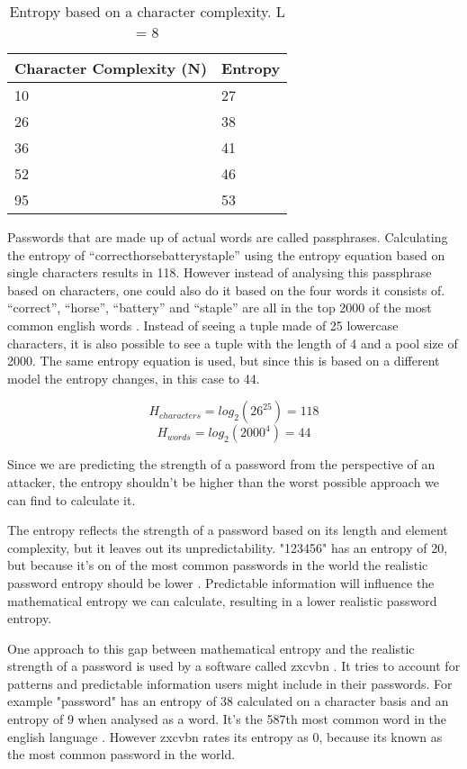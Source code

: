 \begin{table}[h!]
\centering
\begin{tabular}{l l}
    Character Complexity (N) & Entropy \\
    \hline
    10                       & 27 \\
    26                       & 38 \\
    36                       & 41 \\
    52                       & 46 \\
    95                       & 53
\end{tabular}
\caption{Entropy based on a character complexity. L = 8}
\end{table}

Passwords that are made up of actual words are called passphrases. Calculating the entropy of ``correcthorsebatterystaple'' using the entropy equation based on single characters results in 118. However instead of analysing this passphrase based on characters, one could also do it based on the four words it consists of. ``correct'', ``horse'', ``battery'' and ``staple'' are all in the top 2000 of the most common english words \cite{commonwords}. Instead of seeing a tuple made of 25 lowercase characters, it is also possible to see a tuple with the length of 4 and a pool size of 2000. The same entropy equation is used, but since this is based on a different model the entropy changes, in this case to 44.

\begin{equation}
H_{characters} = log_2(26^25) = 118
\end{equation}
\begin{equation}
H_{words} = log_2(2000^4) = 44
\end{equation}

Since we are predicting the strength of a password from the perspective of an attacker, the entropy shouldn't be higher than the worst possible approach we can find to calculate it.

The entropy reflects the strength of a password based on its length and element complexity, but it leaves out its unpredictability. "123456" has an entropy of 20, but because it's on of the most common passwords in the world the realistic password entropy should be lower \cite{passwordquality}. Predictable information will influence the mathematical entropy we can calculate, resulting in a lower realistic password entropy.

One approach to this gap between mathematical entropy and the realistic strength of a password is used by a software called zxcvbn \cite{zxcvbn}. It tries to account for patterns and predictable information users might include in their passwords. For example "password" has an entropy of 38 calculated on a character basis and an entropy of 9 when analysed as a word. It's the 587th most common word in the english language \cite{commonwords}. However zxcvbn rates its entropy as 0, because its known as the most common password in the world.

\newpage